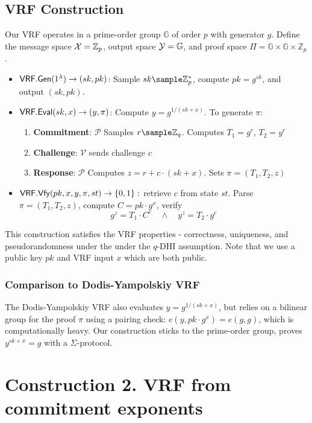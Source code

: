 \subsection{VRF Construction}
Our VRF operates in a prime-order group $\mathbb{G}$ of order $p$ with generator $g$. Define the message space $\mathcal{X} = \mathbb{Z}_p$, output space $\mathcal{Y} = \mathbb{G}$, and proof space $\Pi = \mathbb{G} \times \mathbb{G} \times \mathbb{Z}_p$. 
\begin{itemize}
    \item $\mathsf{VRF.Gen}(1^\lambda) \to (sk, pk)$:  
    Sample $sk \sample \mathbb{Z}_p^*$, compute $pk = g^{sk}$, and output $(sk, pk)$.
    \item $\mathsf{VRF.Eval}(sk, x) \to (y, \pi)$:  
    Compute $y = g^{1/(sk + x)}$.  
    To generate $\pi$:  
    \begin{enumerate}
        \item \textbf{Commitment}: $\mathcal{P}$ Samples $r \sample \Z_q$. Computes $T_1 = g^r$, $T_2 = y^r$
        \item \textbf{Challenge}: $\mathcal{V}$ sends challenge $c$
        \item \textbf{Response}: $\mathcal{P}$ Computes $z= r + c \cdot (sk + x)$. Sets $\pi = (T_1, T_2, z)$
    \end{enumerate}
    \item $\mathsf{VRF.Vfy}(pk, x, y, \pi, st) \to \{0,1\}:$ retrieve $c$ from state $st$. Parse $\pi = (T_1, T_2, z)$, compute $C = pk \cdot g^x$, verify
    \[
        g^z = T_1 \cdot C^c \quad \wedge \quad y^z = T_2 \cdot g^c
    \]
\end{itemize}
This construction satisfies the VRF properties - correctness, uniqueness, and pseudorandomness under the under the $q$-DHI assumption. Note that we use a public key $pk$ and VRF input $x$ which are both public. 

\subsubsection{Comparison to Dodis-Yampolskiy VRF}
The Dodis-Yampolskiy VRF also evaluates $y = g^{1/(sk + x)}$, but relies on a bilinear group for the proof $\pi$ using a pairing check: $e(y, pk \cdot g^x) = e(g, g)$, which is computationally heavy. Our construction sticks to the prime-order group, proves $y^{sk + x} = g$ with a $\Sigma$-protocol.






\section{Construction 2. VRF from commitment exponents}

